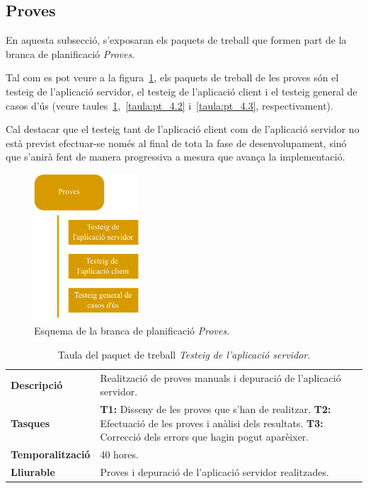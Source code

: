 \documentclass[a4paper,12pt]{ThesisStyle}
\begin{document}
\newpage

\subsection{Proves}
\label{subsec:proves}

En aquesta subsecció, s'exposaran els paquets de treball que formen part de la branca de planificació \emph{Proves}.

Tal com es pot veure a la figura~\ref{img:pt_proves}, els paquets de treball de les proves són el testeig de l'aplicació servidor, el testeig de l'aplicació client i el testeig general de casos d'ús (veure taules~\ref{taula:pt_4.1},~\ref{taula:pt_4.2} i~\ref{taula:pt_4.3}, respectivament).

Cal destacar que el testeig tant de l'aplicació client com de l'aplicació servidor no està previst efectuar-se només al final de tota la fase de desenvolupament, sinó que s'anirà fent de manera progressiva a mesura que avança la implementació.

\begin{figure}[htpb]
	\centering
	\includegraphics[width=0.35\textwidth]{assets/working_packages/proves.pdf}
	\caption{\label{img:pt_proves}Esquema de la branca de planificació \emph{Proves}.}
\end{figure}

\begin{table}[H]
  \begin{tabularx}{\textwidth}{l | X}
    \toprule
    \rowcolor{Orange}
    \multicolumn{2}{c}{\texttt{\textbf{PT\_4.1:}} Testeig de l'aplicació servidor}\\
    \midrule[0.9pt]
    \textbf{Descripció}       & Realització de proves manuals i depuració de l'aplicació servidor.\\
    \midrule
    \textbf{Tasques}          & \textbf{T1:} Disseny de les proves que s'han de realitzar.
    \newline \textbf{T2:} Efectuació de les proves i anàlisi dels resultats.
    \newline \textbf{T3:} Correcció dels errors que hagin pogut aparèixer.\\
    \midrule
    \textbf{Temporalització}  & 40 hores.\\
    \midrule
    \textbf{Lliurable}        & Proves i depuració de l'aplicació servidor realitzades.\\
    \bottomrule
  \end{tabularx}
  \caption{\label{taula:pt_4.1} Taula del paquet de treball \emph{Testeig de l'aplicació servidor}.}
\end{table}
\end{document}
